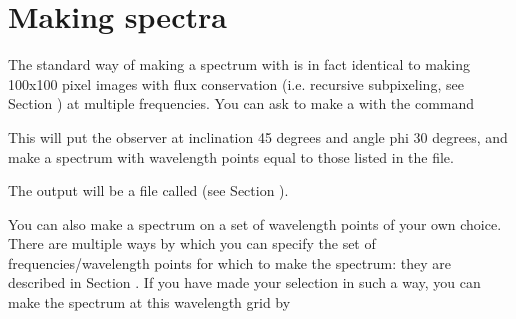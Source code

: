 \documentclass[letterpaper,10pt,english]{sphinxmanual}
\begin{document}
\section{Making spectra}
\label{\detokenize{imagesspectra:making-spectra}}\label{\detokenize{imagesspectra:sec-making-spectra}}
The standard way of making a spectrum with  is in fact identical to
making 100x100 pixel images with flux conservation (i.e. recursive sub\sphinxhyphen{}pixeling,
see Section {\hyperref[\detokenize{imagesspectra:sec-image-refinement}]{}}) at multiple frequencies. You can ask
 to make a  with the command

\begin{sphinxVerbatim}[commandchars=\\\{\}]
     
\end{sphinxVerbatim}

This will put the observer at inclination 45 degrees and angle phi 30 degrees,
and make a spectrum with wavelength points equal to those listed in the
 file.

The output will be a file called  (see Section
{\hyperref[\detokenize{inputoutputfiles:sec-output-spectrum-out}]{}}).

You can also make a spectrum on a set of wavelength points of your own
choice. There are multiple ways by which you can specify the set of
frequencies/wavelength points for which to make the spectrum: they are described
in Section {\hyperref[\detokenize{imagesspectra:sec-set-camera-frequencies}]{}}. If you have made your selection in
such a way, you can make the spectrum at this wavelength grid by

\begin{sphinxVerbatim}[commandchars=\\\{\}]
         
\end{sphinxVerbatim}
\end{document}
